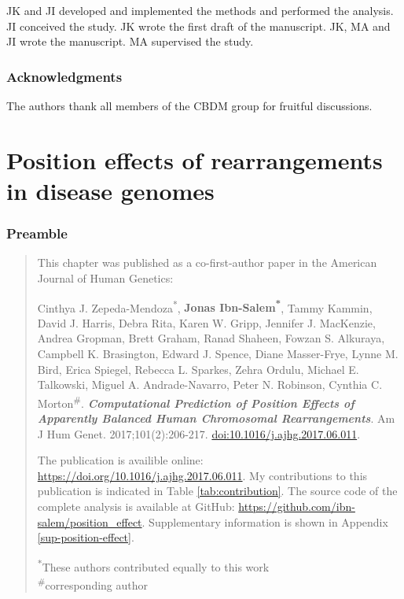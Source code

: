\documentclass[a4paper,twoside=true,openright,parskip=full,chapterprefix=true,11pt,headings=normal,bibliography=totoc,listof=totoc,titlepage=on,captions=tableabove,draft=false]{scrreprt}
\theoremstyle{definition}
\theoremstyle{definition}
\theoremstyle{definition}
\theoremstyle{remark}
\begin{document}
JK and JI developed and implemented the methods and performed the
analysis. JI conceived the study. JK wrote the first draft of the
manuscript. JK, MA and JI wrote the manuscript. MA supervised the study.

\hypertarget{acknowledgments}{%
\subsection{Acknowledgments}\label{acknowledgments}}

The authors thank all members of the CBDM group for fruitful
discussions.

\hypertarget{position-effect}{%
\chapter{Position effects of rearrangements in disease
genomes}\label{position-effect}}

\hypertarget{preamble-2}{%
\subsection*{Preamble}\label{preamble-2}}

\begin{quote}
This chapter was published as a co-first-author paper in the American
Journal of Human Genetics:

Cinthya J. Zepeda-Mendoza\textsuperscript{*}, \textbf{Jonas
Ibn-Salem\textsuperscript{*}}, Tammy Kammin, David J. Harris, Debra
Rita, Karen W. Gripp, Jennifer J. MacKenzie, Andrea Gropman, Brett
Graham, Ranad Shaheen, Fowzan S. Alkuraya, Campbell K. Brasington,
Edward J. Spence, Diane Masser-Frye, Lynne M. Bird, Erica Spiegel,
Rebecca L. Sparkes, Zehra Ordulu, Michael E. Talkowski, Miguel A.
Andrade-Navarro, Peter N. Robinson, Cynthia C.
Morton\textsuperscript{\#}. \textbf{\emph{Computational Prediction of
Position Effects of Apparently Balanced Human Chromosomal
Rearrangements}}. Am J Hum Genet. 2017;101(2):206-217.
\href{https://doi.org/10.1016/j.ajhg.2017.06.011}{doi:10.1016/j.ajhg.2017.06.011}.

The publication is availible online:
\url{https://doi.org/10.1016/j.ajhg.2017.06.011}. My contributions to
this publication is indicated in Table \ref{tab:contribution}. The
source code of the complete analysis is available at GitHub:
\url{https://github.com/ibn-salem/position_effect}. Supplementary
information is shown in Appendix \ref{sup-position-effect}.

\textsuperscript{*}These authors contributed equally to this work\\
\textsuperscript{\#}corresponding author
\end{quote}
\end{document}
